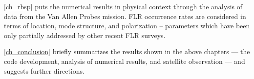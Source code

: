 \cref{ch_rbsp} puts the numerical results in physical context through the analysis of data from the Van Allen Probes mission. FLR occurrence rates are considered in terms of location, mode structure, and polarization -- parameters which have been only partially addressed by other recent FLR surveys\cite{dai_2015,motoba_2015}. 

\cref{ch_conclusion} briefly summarizes the results shown in the above chapters --- the code development, analysis of numerical results, and satellite observation --- and suggests further directions. 








